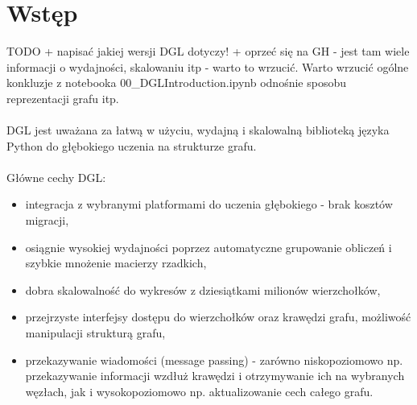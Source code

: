\documentclass{article}
\begin{document}
\section{Wstęp}
\label{sec:intro}
TODO + napisać jakiej wersji DGL dotyczy! + oprzeć się na GH - jest tam wiele informacji o wydajności, skalowaniu itp - warto to wrzucić. Warto wrzucić ogólne konkluzje z notebooka 00\_DGLIntroduction.ipynb odnośnie sposobu reprezentacji grafu itp.
\paragraph{}
DGL jest uważana za łatwą w użyciu, wydajną i skalowalną biblioteką języka Python do głębokiego uczenia na strukturze grafu.
\paragraph{}
Główne cechy DGL:
\begin{itemize}
  \item
  integracja z wybranymi platformami do uczenia głębokiego - brak kosztów migracji, 
  \item 
  osiągnie wysokiej wydajności poprzez automatyczne grupowanie obliczeń i szybkie mnożenie macierzy rzadkich,
  \item 
  dobra skalowalność do wykresów z dziesiątkami milionów wierzchołków,
  \item 
  przejrzyste interfejsy dostępu do wierzchołków oraz krawędzi grafu, możliwość manipulacji strukturą grafu,
  \item 
  przekazywanie wiadomości (message passing) - zarówno niskopoziomowo np. przekazywanie informacji wzdłuż krawędzi i otrzymywanie ich na wybranych węzłach, jak i wysokopoziomowo np. aktualizowanie cech całego grafu.
  
 \end{itemize}
\end{document}
